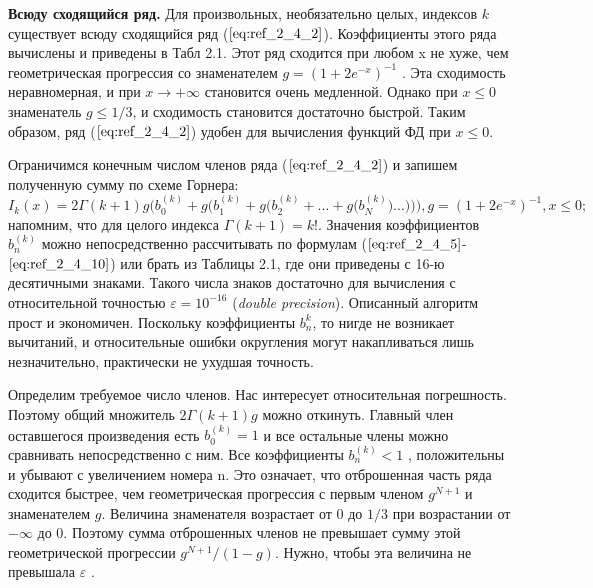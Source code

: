\textbf{Всюду сходящийся ряд.} Для произвольных, необязательно целых,
индексов $k$ существует всюду сходящийся ряд ($\ref{eq:ref_2_4_2}$).
Коэффициенты этого ряда вычислены и приведены в Табл 2.1.
Этот ряд сходится при любом x не хуже, чем геометрическая прогрессия со
знаменателем $g = (1 + 2e^{-x})^{-1}$ . Эта сходимость неравномерная, и при $x \to +\infty$
становится очень медленной. Однако при $x \leqslant 0$ знаменатель $g \leqslant 1/3$, и
сходимость становится достаточно быстрой. Таким образом, ряд ($\ref{eq:ref_2_4_2}$) удобен для
вычисления функций ФД при $x \leqslant 0$.

Ограничимся конечным числом членов ряда ($\ref{eq:ref_2_4_2}$) и запишем
полученную сумму по схеме Горнера:
\begin{equation}
I_k(x) = 2 \Gamma (k+1)g \Bigg(b_0^{(k)} + g \Bigg(b_1^{(k)} + g \Bigg(b_2^{(k)} + ... + g \Bigg(b_N^{(k)}\Bigg)...\Bigg)\Bigg)\Bigg), g = (1 + 2e^{-x})^{-1}, x \leqslant 0;
\label{eq:ref_3_2_3}
\end{equation}
напомним, что для целого индекса $\Gamma(k+1) = k!$. Значения коэффициентов $b_n^{(k)}$
можно непосредственно рассчитывать по формулам ($\ref{eq:ref_2_4_5}$-$\ref{eq:ref_2_4_10}$) или брать из Таблицы 2.1, где
они приведены с 16-ю десятичными знаками. Такого числа знаков достаточно
для вычисления с относительной точностью $\varepsilon = 10^{-16}$ (\textit{double precision}).
Описанный алгоритм прост и экономичен. Поскольку коэффициенты $b_n^{k}$, то нигде не возникает вычитаний, и относительные ошибки округления могут накапливаться лишь незначительно, практически не ухудшая точность.

Определим требуемое число членов. Нас интересует относительная погрешность. Поэтому
общий множитель $2\Gamma(k + 1)g$ можно откинуть. Главный член оставшегося
произведения есть $b_0^{(k)}=1$ и все остальные члены можно сравнивать
непосредственно с ним. Все коэффициенты $b_n^{(k)}<1$ , положительны и убывают с
увеличением номера n. Это означает, что отброшенная часть ряда сходится
быстрее, чем геометрическая прогрессия с первым членом $g^{N+1}$ и знаменателем
$g$. Величина знаменателя возрастает от $0$ до $1/3$ при возрастании от $-\infty$ до 0.
Поэтому сумма отброшенных членов не превышает сумму этой геометрической
прогрессии $g^{N+1}/(1-g)$. Нужно, чтобы эта величина не превышала $\varepsilon$ .

